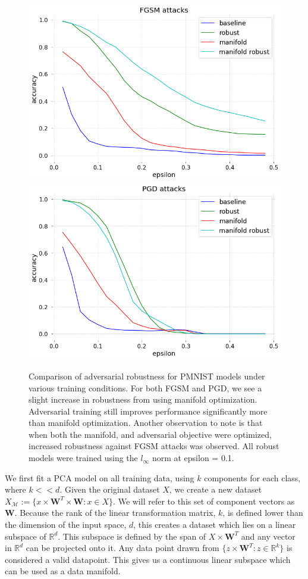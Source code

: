 \begin{figure}[h]
    \centering
    \includegraphics[width=0.8\linewidth]{c3_figures/FGSM_attacks_accuracy_known_manifold.png}
    \includegraphics[width=0.8\linewidth]{c3_figures/PGD_attacks_accuracy_known_manifold.png}
    \caption{Comparison of adversarial robustness for PMNIST models under various training conditions. For both FGSM and PGD, we see a slight increase in robustness from using manifold optimization. Adversarial training still improves performance significantly more than manifold optimization. Another observation to note is that when both the manifold, and adversarial objective were optimized, increased robustness against FGSM attacks was observed. All robust models were trained using the $l_\infty$ norm at epsilon = 0.1.}
    \label{fig:model_robustness}
\end{figure}

We first fit a PCA model on all training data, using $k$ components for each class, where $k << d$.
Given the original dataset $X$, we create a new dataset $X_{\mathcal{M}} := \{x \times \textbf{W}^T \times \textbf{W} : x \in X \}$.
We will refer to this set of component vectors as $\textbf{W}$.
Because the rank of the linear transformation matrix, $k$, is defined lower than the dimension of the input space, $d$, this creates a dataset which lies on a linear subspace of $\mathds{R}^d$.
This subspace is defined by the span of $X \times \textbf{W}^T$ and any vector in $\mathds{R}^d$ can be projected onto it.
Any data point drawn from $\{z \times \textbf{W}^T : z \in \mathds{R}^k \}$ is considered a valid datapoint.
This gives us a continuous linear subspace which can be used as a data manifold.

